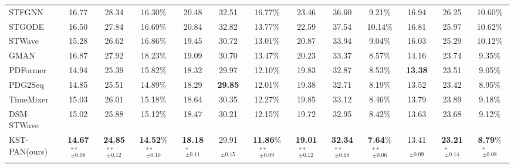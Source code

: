 \documentclass[5p,times,authoryear]{elsarticle}
\begin{document}
\begin{table}[!t]
{\begin{tabular}{@{}lcccccccccccc@{}}
        STFGNN & 16.77 & 28.34 & 16.30\% & 20.48 & 32.51 & 16.77\% & 23.46 & 36.60 & 9.21\% & 16.94 & 26.25 & 10.60\% \\
        STGODE & 16.50 & 27.84 & 16.69\% & 20.84 & 32.82 & 13.77\% & 22.59 & 37.54 & 10.14\% & 16.81 & 25.97 & 10.62\% \\
        STWave & 15.28 & 26.62 & 16.86\% & 19.45 & 30.72 & 13.01\% & 20.87 & 33.94 & 9.04\% & 16.03 & 25.29 & 10.12\% \\
        GMAN & 16.87 & 27.92 & 18.23\% & 19.09 & 30.70 & 13.47\% & 20.23 & 33.37 & 8.57\% & 14.16 & 23.74 & 9.35\% \\
        PDFormer & 14.94 & 25.39 & 15.82\% & 18.32 & 29.97 & 12.10\% & 19.83 & 32.87 & 8.53\% & \textbf{13.38} & 23.51 & 9.05\% \\
        PDG2Seq & 14.85 & 25.51 & 14.89\% & 18.29 & \textbf{29.85} & 12.01\% & 19.38 & 32.71 & 8.19\% & 13.52 & 23.42 & 8.95\% \\
        TimeMixer & 15.03 & 26.01 & 15.18\% & 18.64 & 30.35 & 12.27\% & 19.85 & 33.12 & 8.46\% & 13.79 & 23.89 & 9.18\% \\
        DSM-STWave & 15.02 & 25.88 & 15.12\% & 18.47 & 30.21 & 12.15\% & 19.72 & 32.95 & 8.42\% & 13.63 & 23.68 & 9.12\% \\
        \midrule
        KST-PAN(ours) & \textbf{14.67}$_{\pm0.08}^{**}$ & \textbf{24.85}$_{\pm0.12}^{**}$ & \textbf{14.52}\%$_{\pm0.10}^{**}$ & \textbf{18.18}$_{\pm0.11}^{*}$ & 29.91$_{\pm0.15}$ & \textbf{11.86}\%$_{\pm0.09}^{**}$ & \textbf{19.01}$_{\pm0.12}^{**}$ & \textbf{32.34}$_{\pm0.18}^{**}$ & \textbf{7.64}\%$_{\pm0.06}^{**}$ & 13.41$_{\pm0.09}$ & \textbf{23.21}$_{\pm0.14}^{*}$ & \textbf{8.79}\%$_{\pm0.08}^{*}$ \\
        \addlinespace[0.5ex] %
        \bottomrule
    \end{tabular}
    }
\end{table}
\end{document}
